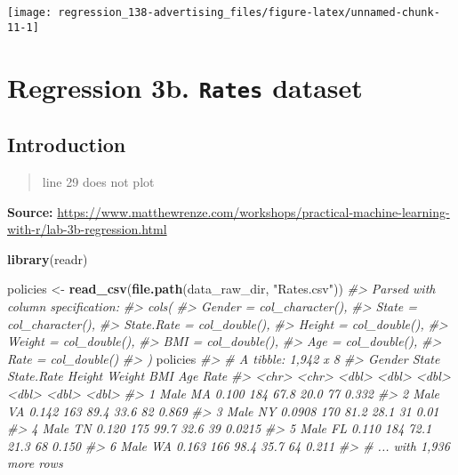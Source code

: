 \documentclass[]{book}
\newenvironment{Shaded}{\begin{snugshade}}{\end{snugshade}}
\newcommand{\CommentTok}[1]{\textcolor[rgb]{0.56,0.35,0.01}{\textit{#1}}}
\newcommand{\KeywordTok}[1]{\textcolor[rgb]{0.13,0.29,0.53}{\textbf{#1}}}
\newcommand{\NormalTok}[1]{#1}
\newcommand{\StringTok}[1]{\textcolor[rgb]{0.31,0.60,0.02}{#1}}
\begin{document}
\begin{center}\texttt{[image: regression\_138-advertising\_files/figure-latex/unnamed-chunk-11-1]} \end{center}

\hypertarget{regression-3b.-rates-dataset}{%
\chapter{\texorpdfstring{Regression 3b. \texttt{Rates} dataset}{Regression 3b. Rates dataset}}\label{regression-3b.-rates-dataset}}

\hypertarget{introduction-1}{%
\section{Introduction}\label{introduction-1}}

\begin{quote}
line 29 does not plot
\end{quote}

\textbf{Source:} \url{https://www.matthewrenze.com/workshops/practical-machine-learning-with-r/lab-3b-regression.html}

\begin{Shaded}
\begin{Highlighting}[]
\KeywordTok{library}\NormalTok{(readr)}

\NormalTok{policies <-}\StringTok{ }\KeywordTok{read_csv}\NormalTok{(}\KeywordTok{file.path}\NormalTok{(data_raw_dir, }\StringTok{"Rates.csv"}\NormalTok{))}
\CommentTok{#> Parsed with column specification:}
\CommentTok{#> cols(}
\CommentTok{#>   Gender = col_character(),}
\CommentTok{#>   State = col_character(),}
\CommentTok{#>   State.Rate = col_double(),}
\CommentTok{#>   Height = col_double(),}
\CommentTok{#>   Weight = col_double(),}
\CommentTok{#>   BMI = col_double(),}
\CommentTok{#>   Age = col_double(),}
\CommentTok{#>   Rate = col_double()}
\CommentTok{#> )}
\NormalTok{policies}
\CommentTok{#> # A tibble: 1,942 x 8}
\CommentTok{#>   Gender State State.Rate Height Weight   BMI   Age   Rate}
\CommentTok{#>   <chr>  <chr>      <dbl>  <dbl>  <dbl> <dbl> <dbl>  <dbl>}
\CommentTok{#> 1 Male   MA        0.100     184   67.8  20.0    77 0.332 }
\CommentTok{#> 2 Male   VA        0.142     163   89.4  33.6    82 0.869 }
\CommentTok{#> 3 Male   NY        0.0908    170   81.2  28.1    31 0.01  }
\CommentTok{#> 4 Male   TN        0.120     175   99.7  32.6    39 0.0215}
\CommentTok{#> 5 Male   FL        0.110     184   72.1  21.3    68 0.150 }
\CommentTok{#> 6 Male   WA        0.163     166   98.4  35.7    64 0.211 }
\CommentTok{#> # ... with 1,936 more rows}
\end{Highlighting}
\end{Shaded}
\end{document}
